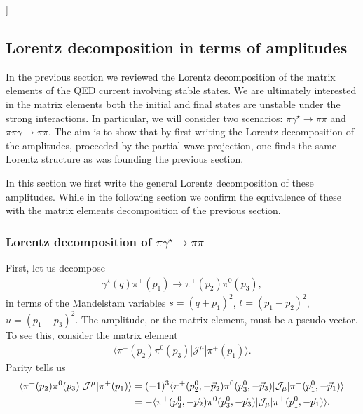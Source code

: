 { }

{\raul [compare with the equation appearing in page 18 of arXiv:0902.2241v1 [hep-ph]]}

 \subsection{Lorentz decomposition in terms of amplitudes \label{sec:Lorentz_amps}}
In the previous section we reviewed the Lorentz decomposition of the matrix elements of the QED current involving stable states. We are ultimately interested in the matrix elements both the initial and final states are unstable under the strong interactions. In particular, we will consider two scenarios: $\pi\gamma^\star\to\pi\pi$ and $\pi\pi\gamma\to\pi\pi$. The aim is to show that by first writing the Lorentz decomposition of the amplitudes, proceeded by the partial wave projection, one finds the same Lorentz structure as was founding the previous section. 

In this section we first write the general Lorentz decomposition of these amplitudes. While in the following section we confirm the equivalence of these with the matrix elements decomposition of the previous section. 

\subsubsection{Lorentz decomposition of $\pi\gamma^\star\to\pi\pi$}
{} 


First, let us decompose 
\begin{align}
\gamma^\star(q)\pi^+(p_1)\to\pi^+(p_2)\pi^0(p_3),
\end{align}
in terms of the Mandelstam variables $s=(q+p_1)^2$, $t=(p_1-p_2)^2$, $u=(p_1-p_3)^2$. The amplitude, or the matrix element, must be a pseudo-vector. To see this, consider the matrix element
\begin{align}
\langle \pi^+(p_2)\pi^0(p_3)|\mathcal{J}^\mu|\pi^+(p_1)\rangle.
\end{align}
Parity tells us 
\begin{align}
\langle \pi^+(p_2)\pi^0(p_3)|\mathcal{J}^\mu|\pi^+(p_1)\rangle
&=
(-1)^3\langle \pi^+(p_2^0,-\vec{p}_2)\pi^0(p_3^0,-\vec{p}_3)|\mathcal{J}_\mu|\pi^+(p_1^0,-\vec{p}_1)\rangle
\nonumber\\
&=
-\langle \pi^+(p_2^0,-\vec{p}_2)\pi^0(p_3^0,-\vec{p}_3)|\mathcal{J}_\mu|\pi^+(p_1^0,-\vec{p}_1)\rangle.
\end{align} 

